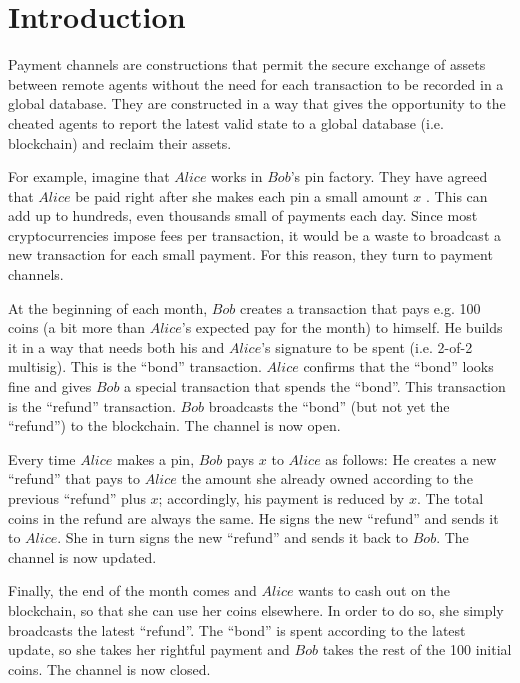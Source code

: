 \section{Introduction}
  Payment channels are constructions that permit the secure exchange of assets between
  remote agents without the need for each transaction to be recorded in a global database.
  They are constructed in a way that gives the opportunity to the cheated agents to report
  the latest valid state to a global database (i.e. blockchain) and reclaim their assets.

  For example, imagine that $Alice$ works in $Bob$'s pin factory. They have agreed that
  $Alice$ be paid right after she makes each pin a small amount $x$ \cite{bdevguide}. This
  can add up to hundreds, even thousands small of payments each day. Since most
  cryptocurrencies impose fees per transaction, it would be a waste to broadcast a new
  transaction for each small payment. For this reason, they turn to payment channels.

  At the beginning of each month, $Bob$ creates a transaction that pays e.g. 100 coins (a
  bit more than $Alice$'s expected pay for the month) to himself. He builds it in a way
  that needs both his and $Alice$'s signature to be spent (i.e. 2-of-2 multisig). This is
  the ``bond'' transaction. $Alice$ confirms that the ``bond'' looks fine and gives $Bob$
  a special transaction that spends the ``bond''. This transaction is the ``refund''
  transaction. $Bob$ broadcasts the ``bond'' (but not yet the ``refund'') to the
  blockchain. The channel is now open.

  Every time $Alice$ makes a pin, $Bob$ pays $x$ to $Alice$ as follows: He creates a new
  ``refund'' that pays to $Alice$ the amount she already owned according to the previous
  ``refund'' plus $x$; accordingly, his payment is reduced by $x$. The total coins in
  the refund are always the same. He signs the new ``refund'' and sends it to $Alice$. She
  in turn signs the new ``refund'' and sends it back to $Bob$. The channel is now updated.

  Finally, the end of the month comes and $Alice$ wants to cash out on the blockchain, so
  that she can use her coins elsewhere. In order to do so, she simply broadcasts the
  latest ``refund''. The ``bond'' is spent according to the latest update, so she takes
  her rightful payment and $Bob$ takes the rest of the 100 initial coins. The channel is
  now closed.
